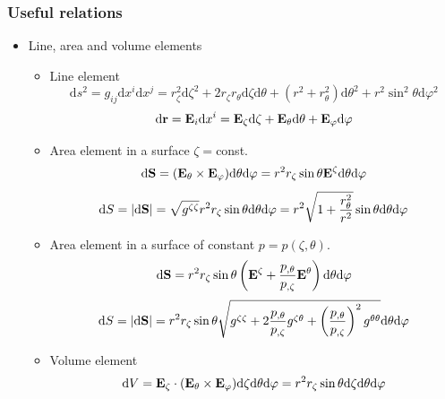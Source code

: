 \subsubsection{Useful relations}
\begin{itemize}
\item Line, area and volume elements
\begin{itemize}
\item Line element
\begin{equation}
\mathrm{d}s^2=g_{ij}\mathrm{d}x^i\mathrm{d}x^j=r_\zeta^2\mathrm{d}\zeta^2+2r_\zeta r_\theta \mathrm{d}\zeta \mathrm{d}\theta+
(r^2+r_\theta^2)\mathrm{d}\theta^2+r^2\sin^2\theta \mathrm{d}\varphi^2
\end{equation}
\begin{equation}
\mathrm{d}\mathbf{r}=\mathbf{E}_i \mathrm{d}x^i=\mathbf{E}_\zeta \mathrm{d}\zeta+\mathbf{E}_\theta \mathrm{d}\theta
+\mathbf{E}_\varphi \mathrm{d}\varphi
\end{equation}
\item Area element in a surface $\zeta=$const.
\begin{equation}
\mathrm{d}\mathbf{S}=(\mathbf{E}_\theta\times \mathbf{E}_\varphi)\mathrm{d}\theta \mathrm{d}\varphi=
r^2r_\zeta\sin\theta\mathbf{E}^\zeta \mathrm{d}\theta \mathrm{d}\varphi
\end{equation}
\begin{equation}
\mathrm{d}S=|\mathrm{d}\mathbf{S}|=
\sqrt{g^{\zeta\zeta}}r^2r_\zeta\sin\theta \mathrm{d}\theta \mathrm{d}\varphi=
r^2\sqrt{1+\frac{r_\theta^2}{r^2}}\sin\theta \mathrm{d}\theta \mathrm{d}\varphi
\end{equation}
\item Area element in a surface of constant $p=p(\zeta,\theta)$.
\begin{equation}
\mathrm{d}\mathbf{S}=
r^2r_\zeta\sin\theta\left(\mathbf{E}^\zeta+\frac{p_{,\theta}}{p_{,\zeta}}\mathbf{E}^{\theta}
\right) \mathrm{d}\theta \mathrm{d}\varphi
\end{equation}
\begin{equation}
\mathrm{d}S=|\mathrm{d}\mathbf{S}|=r^2r_\zeta\sin\theta
\sqrt{g^{\zeta\zeta}+2\frac{p_{,\theta}}{p_{,\zeta}}g^{\zeta\theta}
+\left(\frac{p_{,\theta}}{p_{,\zeta}}\right)^2g^{\theta\theta}}
\mathrm{d}\theta \mathrm{d}\varphi
\end{equation}
\item Volume element
\begin{equation}
\mathrm{d}V=\vect E_\zeta\cdot(\vect E_\theta\times\vect E_\varphi)\mathrm{d}\zeta \mathrm{d}\theta \mathrm{d}\varphi=
r^2r_\zeta\sin\theta \mathrm{d}\zeta \mathrm{d}\theta \mathrm{d}\varphi

\end{equation}
\end{itemize}
\end{itemize}
